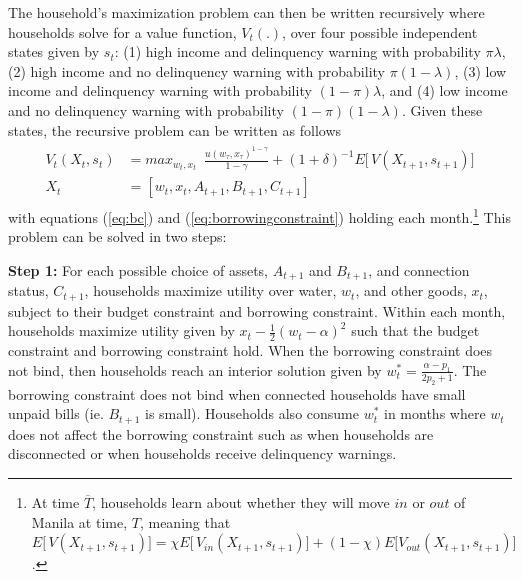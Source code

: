 \documentclass[12pt]{article}
\begin{document}
The household's maximization problem can then be written recursively where households solve for a value function, $V_t(.)$, over four possible independent states given by $s_{t}$: (1) high income and delinquency warning with probability $\pi\lambda$, (2) high income and no delinquency warning with probability $\pi(1-\lambda)$, (3) low income and delinquency warning with probability $(1-\pi)\lambda$, and (4) low income and no delinquency warning with probability $(1-\pi)(1-\lambda)$.  Given these states, the recursive problem can be written as follows
\begin{align}
\label{eq:valmax}
\begin{split}
V_t(X_{t},s_t) &= max_{w_t,x_{t}} \,\,\, \frac{u(w_{\tau},x_{\tau})^{1-\gamma}}{1-\gamma}   + (1+\delta)^{-1}  E \Big[\, V(X_{t+1},s_{t+1})\Big] \\
X_t &= [w_t,x_t,A_{t+1},B_{t+1},C_{t+1}] 
\end{split}
\end{align}
with equations (\ref{eq:bc}) and (\ref{eq:borrowingconstraint}) holding each month.\footnote{At time $\overline{T}$, households learn about whether they will move $in$ or $out$ of Manila at time, $T$, meaning that $E \Big[\, V(X_{t+1},s_{t+1})\Big] =  \chi E \Big[\,V_{in}(X_{t+1},s_{t+1})\Big] + (1-\chi) E\Big[V_{out}(X_{t+1},s_{t+1})\Big]$.}  This problem can be solved in two steps: %


\textbf{Step 1:} For each possible choice of assets, $A_{t+1}$ and $B_{t+1}$, and connection status, $C_{t+1}$, households maximize utility over water, $w_t$, and other goods, $x_t$, subject to their budget constraint and borrowing constraint.  Within each month, households maximize utility given by $ x_t -  \frac{1}{2} (w_t - \alpha)^2 $ such that the budget constraint and borrowing constraint hold.  When the borrowing constraint does not bind, then households reach an interior solution given by $w_t^{*} =  \frac{ \alpha - p_1}{2p_2 + 1}$.  The borrowing constraint does not bind when connected households have small unpaid bills (ie. $B_{t+1}$ is small).  Households also consume $w_t^{*}$ in months where $w_t$ does not affect the borrowing constraint such as when households are disconnected or when households receive delinquency warnings.
\end{document}
